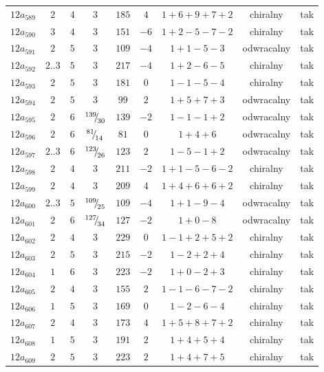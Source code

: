 \begin{longtable}{ccccccccc}
$12a_{589}$ & $2$ & $4$ & $3$ & $185$ & $4$ & $1+6+9+7+2$ & chiralny & tak \\
$12a_{590}$ & $3$ & $4$ & $3$ & $151$ & $-6$ & $1+2-5-7-2$ & chiralny & tak \\
$12a_{591}$ & $2$ & $5$ & $3$ & $109$ & $-4$ & $1+1-5-3$ & odwracalny & tak \\
$12a_{592}$ & $2..3$ & $5$ & $3$ & $217$ & $-4$ & $1+2-6-5$ & chiralny & tak \\
$12a_{593}$ & $2$ & $5$ & $3$ & $181$ & $0$ & $1-1-5-4$ & chiralny & tak \\
$12a_{594}$ & $2$ & $5$ & $3$ & $99$ & $2$ & $1+5+7+3$ & odwracalny & tak \\
$12a_{595}$ & $2$ & $6$ & ${}^{139}{\mskip -5mu/\mskip -3mu}_{30}$ & $139$ & $-2$ & $1-1-1+2$ & odwracalny & tak \\
$12a_{596}$ & $2$ & $6$ & ${}^{81}{\mskip -5mu/\mskip -3mu}_{14}$ & $81$ & $0$ & $1+4+6$ & odwracalny & tak \\
$12a_{597}$ & $2..3$ & $6$ & ${}^{123}{\mskip -5mu/\mskip -3mu}_{26}$ & $123$ & $2$ & $1-5-1+2$ & odwracalny & tak \\
$12a_{598}$ & $2$ & $4$ & $3$ & $211$ & $-2$ & $1+1-5-6-2$ & chiralny & tak \\
$12a_{599}$ & $2$ & $4$ & $3$ & $209$ & $4$ & $1+4+6+6+2$ & chiralny & tak \\
$12a_{600}$ & $2..3$ & $5$ & ${}^{109}{\mskip -5mu/\mskip -3mu}_{25}$ & $109$ & $-4$ & $1+1-9-4$ & odwracalny & tak \\
$12a_{601}$ & $2$ & $6$ & ${}^{127}{\mskip -5mu/\mskip -3mu}_{34}$ & $127$ & $-2$ & $1+0-8$ & odwracalny & tak \\
$12a_{602}$ & $2$ & $4$ & $3$ & $229$ & $0$ & $1-1+2+5+2$ & chiralny & tak \\
$12a_{603}$ & $2$ & $5$ & $3$ & $215$ & $-2$ & $1-2+2+4$ & chiralny & tak \\
$12a_{604}$ & $1$ & $6$ & $3$ & $223$ & $-2$ & $1+0-2+3$ & chiralny & tak \\
$12a_{605}$ & $2$ & $4$ & $3$ & $155$ & $2$ & $1-1-6-7-2$ & chiralny & tak \\
$12a_{606}$ & $1$ & $5$ & $3$ & $169$ & $0$ & $1-2-6-4$ & chiralny & tak \\
$12a_{607}$ & $2$ & $4$ & $3$ & $173$ & $4$ & $1+5+8+7+2$ & chiralny & tak \\
$12a_{608}$ & $1$ & $5$ & $3$ & $191$ & $2$ & $1+4+5+4$ & chiralny & tak \\
$12a_{609}$ & $2$ & $5$ & $3$ & $223$ & $2$ & $1+4+7+5$ & chiralny & tak \\

\end{longtable}
